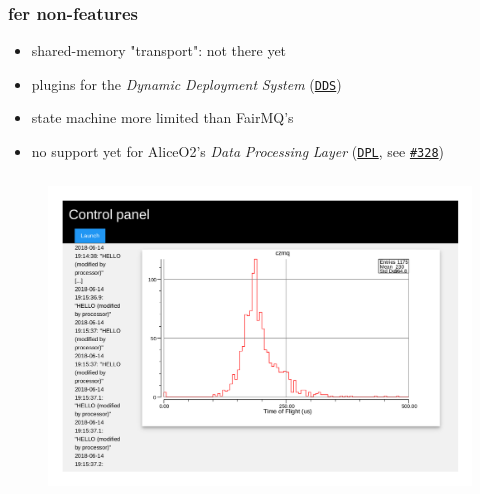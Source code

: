 \documentclass[9pt]{beamer}
\newcommand{\myblue} [1] {{\color{blue}#1}}
\begin{document}
\begin{frame}[fragile]
\frametitle{fer non-features}


\begin{itemize}
\item shared-memory "transport": not there yet
\item plugins for the \emph{Dynamic} \emph{Deployment} \emph{System} (\myblue{\href{http://dds.gsi.de/}{\texttt{DDS}}})
\item state machine more limited than FairMQ's
\item no support yet for AliceO2's \emph{Data} \emph{Processing} \emph{Layer} (\myblue{\href{https://github.com/AliceO2Group/AliceO2/tree/dev/Framework/Core}{\texttt{DPL}}}, see \myblue{\href{https://indico.cern.ch/event/587955/timetable/?view=standard\#328-evolution-of-the-alice-sof}{\texttt{\#328}}})
\end{itemize}


\end{frame}

\begin{frame}[fragile]
\frametitle{}


\begin{figure}[h]
\begin{center}
\includegraphics[width=12cm,height=8cm]{_figs/fer-czmq.png}
\end{center}

\end{figure}


\end{frame}
\end{document}
